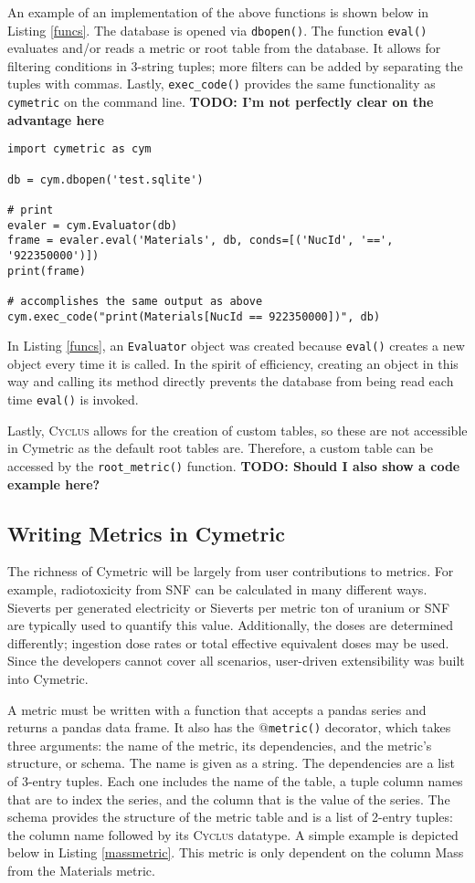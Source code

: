 \documentclass{anstrans}
\newcommand{\cyclus}{\textsc{Cyclus}\xspace}
\newcommand{\TODO}[1] {{\color{red}\textbf{TODO: #1}}}
\newcommand{\code}[1]{{\color{code}\texttt{#1}}}
\begin{document}
An example of an implementation of the above functions is shown below in Listing \ref{funcs}. The database is opened via \code{dbopen()}. The function \code{eval()} evaluates and/or reads a metric or root table from the database. It allows for filtering conditions in 3-string tuples; more filters can be added by separating the tuples with commas. Lastly, \code{exec\_code()} provides the same functionality as \code{cymetric} on the command line. \TODO{I'm not perfectly clear on the advantage here}

\begin{lstlisting}[caption ={Example Python Script Using Cymetric}, label=funcs]
import cymetric as cym

db = cym.dbopen('test.sqlite')

# print 
evaler = cym.Evaluator(db)
frame = evaler.eval('Materials', db, conds=[('NucId', '==', '922350000')])
print(frame)

# accomplishes the same output as above
cym.exec_code("print(Materials[NucId == 922350000])", db)
\end{lstlisting}

In Listing \ref{funcs}, an \code{Evaluator} object was created because \code{eval()} creates a new object every time it is called. In the spirit of efficiency, creating an object in this way and calling its method directly prevents the database from being read each time \code{eval()} is invoked. 

Lastly, \cyclus allows for the creation of custom tables, so these are not accessible in Cymetric as the default root tables are. Therefore, a custom table can be accessed by the \code{root\_metric()} function. \TODO{Should I also show a code example here?}

\subsection{Writing Metrics in Cymetric}
The richness of Cymetric will be largely from user contributions to metrics. For example, radiotoxicity from \gls{SNF} can be calculated in many different ways. Sieverts per generated electricity or Sieverts per metric ton of uranium or \gls{SNF} are typically used to quantify this value. Additionally, the doses are determined differently; ingestion dose rates or total effective equivalent doses may be used. Since the developers cannot cover all scenarios, user-driven extensibility was built into Cymetric. 

A metric must be written with a function that accepts a pandas series and returns a pandas data frame. It also has the \code{$@$metric()} decorator, which takes three arguments: the name of the metric, its dependencies, and the metric's structure, or schema. The name is given as a string. The dependencies are a list of 3-entry tuples. Each one includes the name of the table, a tuple column names that are to index the series, and the column that is the value of the series. The schema provides the structure of the metric table and is a list of 2-entry tuples: the column name followed by its \cyclus datatype. A simple example is depicted below in Listing \ref{massmetric}. This metric is only dependent on the column Mass from the Materials metric. 
\end{document}
